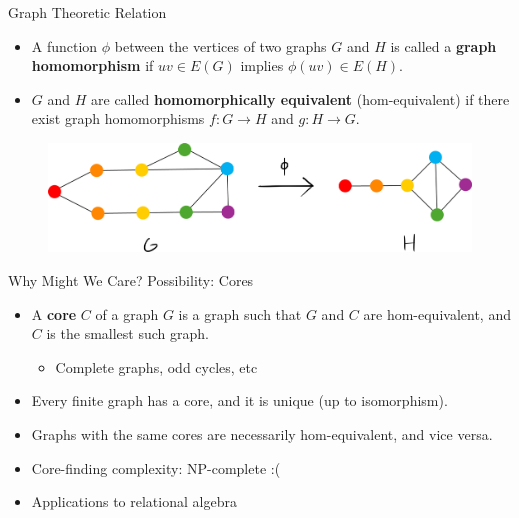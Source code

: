 \documentclass{beamer}
\begin{document}
\begin{frame}{Graph Theoretic Relation}
  \begin{itemize}
    \item A function $\phi$ between the vertices of two graphs $G$ and $H$ is called a \textbf{graph homomorphism} if $uv\in E(G)$ implies $\phi(uv)\in E(H)$.
    \item $G$ and $H$ are called \textbf{homomorphically equivalent} (hom-equivalent) if there exist graph homomorphisms $f: G\to H$ and $g: H\to G$.
  \end{itemize}
  \begin{figure}
    \begin{center}
      \includegraphics[width=1\textwidth]{graphhomo.png}
    \end{center}
  \end{figure}
\end{frame}

\begin{frame}{Why Might We Care? Possibility: Cores}
  \begin{itemize}
    \item A \textbf{core} $C$ of a graph $G$ is a graph such that $G$ and $C$ are hom-equivalent, and $C$ is the smallest such graph.
    \begin{itemize}
      \item Complete graphs, odd cycles, etc
    \end{itemize}
    \item Every finite graph has a core, and it is unique (up to isomorphism).
    \item Graphs with the same cores are necessarily hom-equivalent, and vice versa.
    \item Core-finding complexity: NP-complete :(
    \item Applications to relational algebra
  \end{itemize}
\end{frame}
\end{document}
